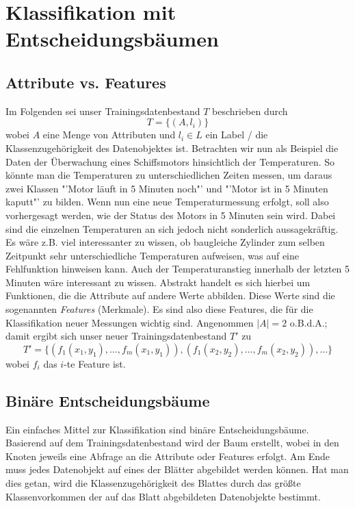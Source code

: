 \section{Klassifikation mit Entscheidungsbäumen}

\subsection{Attribute vs. Features}
Im Folgenden sei unser Trainingsdatenbestand \(T\) beschrieben durch
\[
	T = \{ (A, l_i) \}
\]
wobei \(A\) eine Menge von Attributen und \(l_i \in L\) ein Label / die
Klassenzugehörigkeit des Datenobjektes ist. Betrachten wir nun als Beispiel
die Daten der Überwachung eines Schiffsmotors hinsichtlich der Temperaturen.
So könnte man die Temperaturen zu unterschiedlichen Zeiten messen, um daraus
zwei Klassen "'Motor läuft in 5 Minuten noch"' und "'Motor ist in 5 Minuten
kaputt"' zu bilden. Wenn nun eine neue Temperaturmessung erfolgt, soll also
vorhergesagt werden, wie der Status des Motors in 5 Minuten sein wird.
Dabei sind die einzelnen Temperaturen an sich jedoch nicht sonderlich aussagekräftig.
Es wäre z.B. viel interessanter zu wissen, ob baugleiche Zylinder zum selben
Zeitpunkt sehr unterschiedliche Temperaturen aufweisen, was auf eine Fehlfunktion
hinweisen kann. Auch der Temperaturanstieg innerhalb der letzten 5 Minuten wäre
interessant zu wissen. Abstrakt handelt es sich hierbei um Funktionen, die 
die Attribute auf andere Werte abbilden. Diese Werte sind die sogenannten
\textit{Features} (Merkmale). Es sind also diese Features, die für die Klassifikation
neuer Messungen wichtig sind.
Angenommen \(\lvert A\rvert = 2\) o.B.d.A.; damit ergibt sich unser neuer Trainingsdatenbestand
\(T'\) zu
\[
	T' = \{ (f_1(x_1,y_1), \dots, f_m(x_1,y_1)), (f_1(x_2,y_2), \dots, f_m(x_2,y_2)), \dots\}
\]
wobei \(f_i\) das \(i\)-te Feature ist.

\subsection{Binäre Entscheidungsbäume}
Ein einfaches Mittel zur Klassifikation sind binäre Entscheidungsbäume. Basierend
auf dem Trainingsdatenbestand wird der Baum erstellt, wobei in den Knoten jeweils
eine Abfrage an die Attribute oder Features erfolgt. Am Ende muss jedes Datenobjekt
auf eines der Blätter abgebildet werden können. Hat man dies getan, wird die 
Klassenzugehörigkeit des Blattes durch das größte Klassenvorkommen der auf das
Blatt abgebildeten Datenobjekte bestimmt.

